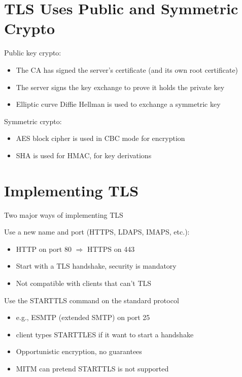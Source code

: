 \documentclass[11pt]{article}
\begin{document}
\section*{TLS Uses Public and Symmetric Crypto}

Public key crypto:

\begin{itemize}
	\item The CA has signed the server's certificate (and its own root certificate)
	\item The server signs the key exchange to prove it holds the private key
	\item Elliptic curve Diffie Hellman is used to exchange a symmetric key
\end{itemize}

Symmetric crypto:

\begin{itemize}
	\item AES block cipher is used in CBC mode for encryption
	\item SHA is used for HMAC, for key derivations
\end{itemize}

\section*{Implementing TLS}

Two major ways of implementing TLS

Use a new name and port (HTTPS, LDAPS, IMAPS, etc.):

\begin{itemize}
	\item HTTP on port 80  $\Rightarrow$ HTTPS on 443
	\item Start with a TLS handshake, security is mandatory
	\item Not compatible with clients that can't TLS
\end{itemize}

Use the STARTTLS command on the standard protocol
\begin{itemize}
	\item e.g., ESMTP (extended SMTP) on port 25
	\item client types STARTTLES if it want to start a handshake
	\item Opportunistic encryption, no guarantees
	\item MITM can pretend STARTTLS is not supported
\end{itemize}
\end{document}
